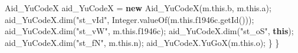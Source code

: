 \documentclass[
]{article}
\newenvironment{Shaded}{}{}
\newcommand{\BuiltInTok}[1]{\textcolor[rgb]{0.00,0.50,0.00}{#1}}
\newcommand{\FunctionTok}[1]{\textcolor[rgb]{0.02,0.16,0.49}{#1}}
\newcommand{\KeywordTok}[1]{\textcolor[rgb]{0.00,0.44,0.13}{\textbf{#1}}}
\newcommand{\NormalTok}[1]{#1}
\newcommand{\OperatorTok}[1]{\textcolor[rgb]{0.40,0.40,0.40}{#1}}
\newcommand{\StringTok}[1]{\textcolor[rgb]{0.25,0.44,0.63}{#1}}
\begin{document}
\begin{Shaded}
\begin{Highlighting}[]
\NormalTok{            Aid\_YuCodeX aid\_YuCodeX }\OperatorTok{=} \KeywordTok{new} \FunctionTok{Aid\_YuCodeX}\OperatorTok{(}\NormalTok{m}\OperatorTok{.}\FunctionTok{this}\OperatorTok{.}\FunctionTok{b}\OperatorTok{,}\NormalTok{ m}\OperatorTok{.}\FunctionTok{this}\OperatorTok{.}\FunctionTok{a}\OperatorTok{);}
\NormalTok{            aid\_YuCodeX}\OperatorTok{.}\FunctionTok{dim}\OperatorTok{(}\StringTok{"st\_vId"}\OperatorTok{,} \BuiltInTok{Integer}\OperatorTok{.}\FunctionTok{valueOf}\OperatorTok{(}\NormalTok{m}\OperatorTok{.}\FunctionTok{this}\OperatorTok{.}\FunctionTok{f1946c}\OperatorTok{.}\FunctionTok{getId}\OperatorTok{()));}
\NormalTok{            aid\_YuCodeX}\OperatorTok{.}\FunctionTok{dim}\OperatorTok{(}\StringTok{"st\_vW"}\OperatorTok{,}\NormalTok{ m}\OperatorTok{.}\FunctionTok{this}\OperatorTok{.}\FunctionTok{f1946c}\OperatorTok{);}
\NormalTok{            aid\_YuCodeX}\OperatorTok{.}\FunctionTok{dim}\OperatorTok{(}\StringTok{"st\_oS"}\OperatorTok{,} \KeywordTok{this}\OperatorTok{);}
\NormalTok{            aid\_YuCodeX}\OperatorTok{.}\FunctionTok{dim}\OperatorTok{(}\StringTok{"st\_fN"}\OperatorTok{,}\NormalTok{ m}\OperatorTok{.}\FunctionTok{this}\OperatorTok{.}\FunctionTok{n}\OperatorTok{);}
\NormalTok{            aid\_YuCodeX}\OperatorTok{.}\FunctionTok{YuGoX}\OperatorTok{(}\NormalTok{m}\OperatorTok{.}\FunctionTok{this}\OperatorTok{.}\FunctionTok{o}\OperatorTok{);}
        \OperatorTok{\}}
    \OperatorTok{\}}


\end{Highlighting}
\end{Shaded}
\end{document}
